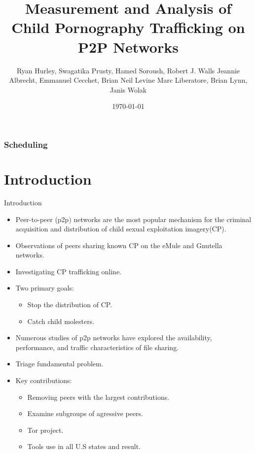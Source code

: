 \documentclass[notes]{beamer}
\title{Measurement and Analysis of Child Pornography Trafficking on P2P Networks\nocite{Hurley}}
\subtitle{}
\institute{Instituto de Computação - Unicamp}
\date{\today}
\author{Ryan Hurley, Swagatika Prusty, Hamed Soroush, Robert J. Walls
Jeannie Albrecht, Emmanuel Cecchet, Brian Neil Levine
Marc Liberatore, Brian Lynn, Janis Wolak}
\begin{document}
\begin{frame}
  \titlepage
\end{frame}

\begin{frame}
  \frametitle{Scheduling}
  \tableofcontents
\end{frame}

\section{Introduction} 
\begin{frame} %
\begin{block}{Introduction}
\begin{itemize} 

\item[\checkmark] Peer-to-peer (p2p) networks are the most popular mechanism for the criminal acquisition and distribution of child sexual exploitation imagery(CP).
\item[\checkmark] Observations of peers sharing known CP on the eMule and Gnutella networks.
\item[\checkmark] Investigating CP trafficking online.
\item[\checkmark] Two primary goals:

\begin{itemize}

\item Stop the distribution of CP.
\item Catch child molesters.

\end{itemize}
\end{itemize}
\end{block}
\end{frame}

\begin{frame}
\begin{itemize}

\item[\checkmark] Numerous studies of p2p networks have explored the availability, performance, and traffic characteristics of file sharing.
\item[\checkmark] Triage fundamental problem.
\item[\checkmark] Key contributions:

\begin{itemize}

\item Removing peers with the largest contributions.
\item Examine subgroups of agressive peers.
\item Tor project.
\item Tools use in all U.S states and result.

\end{itemize}
\end{itemize}
\end{frame}
\end{document}
